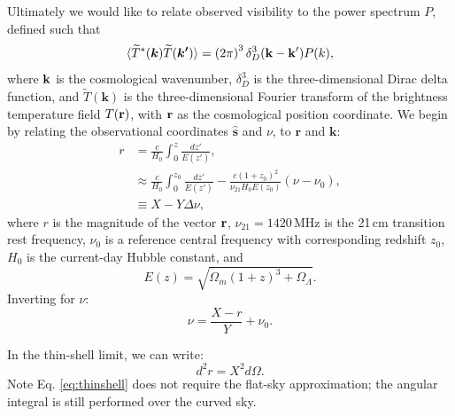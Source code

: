\documentclass[twocolumn,apj,numberedappendix]{emulateapj}
\renewcommand\[{\begin{equation}}
\renewcommand\]{\end{equation}}
\begin{document}



Ultimately we would like to relate observed visibility to the power spectrum $P$, defined such that
\[
\langle \widetilde{T}^{*}(\boldsymbol{k})\widetilde{T}(\boldsymbol{k'})\rangle = \left(2\pi\right)^3\delta_D^3(\bold{k}-\bold{k'})P(k),
\label{eq:Pofk}
\]
where $\bold{k}$ is the cosmological wavenumber, $\delta_D^3$ is the three-dimensional Dirac delta function, and $\widetilde{T}(\boldsymbol{k})$ is the three-dimensional Fourier transform of the brightness temperature field $T(\bold{r})$, with $\bold r$ as the cosmological position coordinate. 
We begin by relating the observational coordinates $\hat{\boldsymbol{s}}$
and $\nu$, to
$\boldsymbol{r}$ and $\boldsymbol{k}$: 
\[
\begin{aligned}r & =\frac{c}{H_{0}}\int_{0}^{z}\frac{dz'}{E(z')},\\
 & \approx\frac{c}{H_{0}}\int_{0}^{z_{0}}\frac{dz'}{E(z')}-\frac{c(1+z_0)^{2}}{\nu_{21}H_{0}E(z_0)}\left(\nu-\nu_{0}\right),\\
 & \equiv X-Y\Delta\nu,
\end{aligned} \label{eq:r}
\]
where $r$ is the magnitude of the vector $\bold{r}$, $\nu_{21}=1420$\,MHz is the 21\,cm transition rest frequency, $\nu_{0}$ is
a reference central frequency with corresponding redshift $z_{0}$, $H_0$ is the current-day Hubble constant,  
and 
\[
E(z)=\sqrt{\Omega_{m}(1+z)^{3}+\Omega_{\Lambda}}.
\]
Inverting for $\nu$:
\begin{equation}
\nu=\frac{X-r}{Y}+\nu_{0}.\label{eq:nur}
\end{equation}

In the thin-shell limit, we can write:
\begin{equation}
d^2r=X^2d\Omega. 
\label{eq:thinshell}
\end{equation}
Note Eq. \eqref{eq:thinshell} does not require the flat-sky approximation; the angular integral is still performed over the curved sky. 
\end{document}
